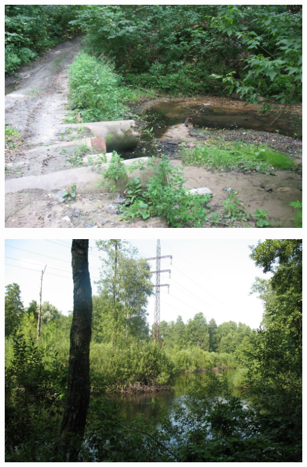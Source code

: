 \begin{center}
\includegraphics[width=\linewidth]{chast-gorodki/darn/s_darn-IMG-2745.JPG}
\end{center}
\vspace*{\fill}
\newpage
\vspace*{\fill}
\begin{center}
\includegraphics[width=\linewidth]{chast-gorodki/darn/s_darn-IMG_2756.JPG}
\end{center}

